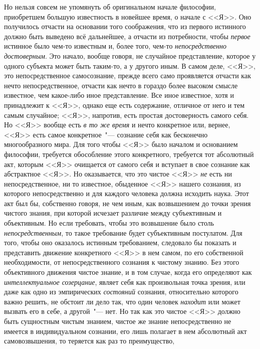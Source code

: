 Но нельзя совсем не упомянуть об оригинальном начале
философии, приобретшем большую известность в новейшее
время, о начале с <<Я>>.
Оно получилось отчасти
на основании того соображения, что из первого истинного
должно быть выведено всё дальнейшее, а отчасти из
потребности, чтобы \emph{первое} истинное было чем-то известным
и, более того, чем-то \emph{непосредственно достоверным}.
Это начало, вообще говоря, не случайное представление,
которое у одного субъекта может быть таким-то, а у другого
иным. В самом деле, <<Я>>, это непосредственное самосознание,
прежде всего само проявляется отчасти как
нечто непосредственное, отчасти как нечто в гораздо более
высоком смысле известное, чем какое-либо иное представление.
Все иное известное, хотя и принадлежит
к <<Я>>, однако еще есть содержание, отличное от него
и тем самым случайное; <<Я>>, напротив, есть простая достоверность
самого себя. Но <<Я>> вообще есть \emph{в то же
время} и нечто конкретное или, вернее, <<Я>> есть самое
конкретное~"--- сознание себя как бесконечно многообразного
мира. Для того чтобы <<Я>> было началом и основанием
философии, требуется обособление этого конкретного,
требуется тот абсолютный акт, которым <<Я>> очищается
от самого себя и вступает в свое сознание как
абстрактное <<Я>>. Но оказывается, что это чистое <<Я>> \emph{не}
есть ни непосредственное, ни то известное, обыденное
<<Я>> нашего сознания, из которого непосредственно и для
каждого человека должна исходить наука. Этот акт был
бы, собственно говоря, не чем иным, как возвышением
до точки зрения чистого знания, при которой исчезает
различие между субъективным и объективным. Но если
требовать, чтобы это возвышение было столь \emph{непосредственным},
то такое требование будет субъективным постулатом.
Для того, чтобы оно оказалось истинным требованием,
следовало бы показать и представить движение
конкретного <<Я>> в нем самом, по его собственной необходимости,
от непосредственного сознания к чистому знанию.
Без этого объективного движения чистое знание, и
в том случае, когда его определяют как \emph{интеллектуальное
созерцание}, являет себя как произвольная точка зрения,
или даже как одно из эмпирических \emph{состояний} сознания,
относительно которого важно решить, не обстоит
ли дело так, что один человек \emph{находит} или может вызвать
его в себе, а другой~"--- нет. Но так как это чистое
<<Я>> должно быть сущностным чистым знанием, чистое
же знание непосредственно не имеется в индивидуальном
сознании, его лишь полагает в нем абсолютный акт
самовозвышения, то теряется как раз то преимущество,
